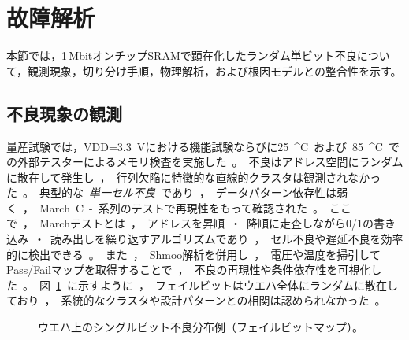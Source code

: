 \documentclass[conference]{IEEEtran}
\begin{document}
\section{故障解析}
本節では，1\,MbitオンチップSRAMで顕在化したランダム単ビット不良について，観測現象，切り分け手順，物理解析，および根因モデルとの整合性を示す。

\subsection{不良現象の観測}
量産試験では，VDD=\SI{3.3}{V}における機能試験ならびに\SI{25}{^\circ C}および\SI{85}{^\circ C}での外部テスターによるメモリ検査を実施した。  
不良はアドレス空間にランダムに散在して発生し，行列欠陥に特徴的な直線的クラスタは観測されなかった。  
典型的な\emph{単一セル不良}であり，データパターン依存性は弱く，March C-系列のテストで再現性をもって確認された。  

ここで，Marchテストとは，アドレスを昇順・降順に走査しながら0/1の書き込み・読み出しを繰り返すアルゴリズムであり，セル不良や遅延不良を効率的に検出できる。  
また，Shmoo解析を併用し，電圧や温度を掃引してPass/Failマップを取得することで，不良の再現性や条件依存性を可視化した。
図\ref{fig:failmap}に示すように，フェイルビットはウエハ全体にランダムに散在しており，
系統的なクラスタや設計パターンとの相関は認められなかった。

\begin{figure}[!t]
\centering
{} %
\caption{ウエハ上のシングルビット不良分布例（フェイルビットマップ）。}
\label{fig:failmap}
\end{figure}
\end{document}

